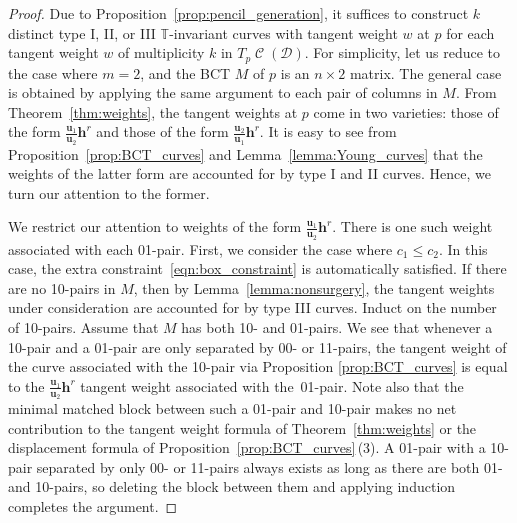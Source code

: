 \documentclass[11pt]{article}
\numberwithin{equation}{section}
\newcommand{\brane}{\mathcal D}
\newcommand{\torus}{\mathbb T}
\newcommand{\hb}{\mathbf h}
\newcommand{\ub}{\mathbf u}
\DeclareMathOperator{\bowvar}{\mathcal C}
\begin{document}
\begin{proof}
Due to Proposition~\ref{prop:pencil_generation}, it suffices to construct $k$ distinct type I, II, or III $\torus$-invariant curves with tangent weight $w$ at $p$ for each tangent weight $w$ of multiplicity $k$ in $T_p\bowvar(\brane)$. For simplicity, let us reduce to the case where $m=2$, and the BCT $M$ of $p$ is an $n\times 2$ matrix. The general case is obtained by applying the same argument to each pair of columns in $M$.
From Theorem~\ref{thm:weights}, the tangent weights at $p$ come in two varieties: those of the form $\frac{\ub_1}{\ub_2}\hb^r$ and those of the form $\frac{\ub_2}{\ub_1}\hb^r$. It is easy to see from Proposition~\ref{prop:BCT_curves} and Lemma~\ref{lemma:Young_curves} that the weights of the latter form are accounted for by type I and II curves. Hence, we turn our attention to the former.

We restrict our attention to weights of the form $\frac{\ub_1}{\ub_2}\hb^r$. There is one such weight associated with each 01-pair. First, we consider the case where $c_1 \leq c_2$. In this case, the extra constraint~\eqref{eqn:box_constraint} is automatically satisfied. If there are no 10-pairs in $M$, then by Lemma~\ref{lemma:nonsurgery}, the tangent weights under consideration are accounted for by type III curves. Induct on the number of 10-pairs. Assume that $M$ has both 10- and 01-pairs. We see that whenever a 10-pair and a 01-pair are only separated by 00- or 11-pairs, the tangent weight of the curve associated with the 10-pair via Proposition \ref{prop:BCT_curves} is equal to the $\frac{\ub_1}{\ub_2}\hb^r$ tangent weight associated with the~01-pair. Note also that the minimal matched block between such a 01-pair and 10-pair makes no net contribution to the tangent weight formula of Theorem~\ref{thm:weights} or the displacement formula of Proposition~\ref{prop:BCT_curves}\,(3). A 01-pair with a 10-pair separated by only 00- or 11-pairs always exists as long as there are both 01- and 10-pairs, so deleting the block between them and applying induction completes the argument.


\end{proof}
\end{document}
